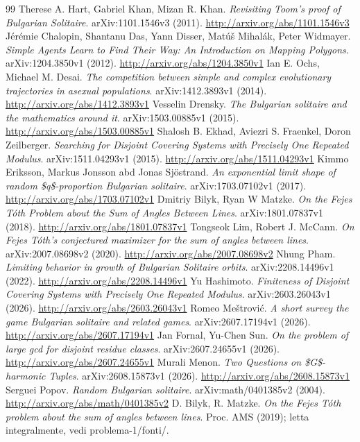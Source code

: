 \documentclass[11pt,a4paper]{article}
\begin{document}
\begin{thebibliography}{99}
 Therese A. Hart, Gabriel Khan, Mizan R. Khan. \emph{Revisiting Toom's proof of Bulgarian Solitaire}. arXiv:1101.1546v3 (2011). \url{http://arxiv.org/abs/1101.1546v3}
 Jérémie Chalopin, Shantanu Das, Yann Disser, Matúš Mihalák, Peter Widmayer. \emph{Simple Agents Learn to Find Their Way: An Introduction on Mapping Polygons}. arXiv:1204.3850v1 (2012). \url{http://arxiv.org/abs/1204.3850v1}
 Ian E. Ochs, Michael M. Desai. \emph{The competition between simple and complex evolutionary trajectories in asexual populations}. arXiv:1412.3893v1 (2014). \url{http://arxiv.org/abs/1412.3893v1}
 Vesselin Drensky. \emph{The Bulgarian solitaire and the mathematics around it}. arXiv:1503.00885v1 (2015). \url{http://arxiv.org/abs/1503.00885v1}
 Shalosh B. Ekhad, Aviezri S. Fraenkel, Doron Zeilberger. \emph{Searching for Disjoint Covering Systems with Precisely One Repeated Modulus}. arXiv:1511.04293v1 (2015). \url{http://arxiv.org/abs/1511.04293v1}
 Kimmo Eriksson, Markus Jonsson abd Jonas Sjöstrand. \emph{An exponential limit shape of random \$q\$-proportion Bulgarian solitaire}. arXiv:1703.07102v1 (2017). \url{http://arxiv.org/abs/1703.07102v1}
 Dmitriy Bilyk, Ryan W Matzke. \emph{On the Fejes Tóth Problem about the Sum of Angles Between Lines}. arXiv:1801.07837v1 (2018). \url{http://arxiv.org/abs/1801.07837v1}
 Tongseok Lim, Robert J. McCann. \emph{On Fejes Tóth's conjectured maximizer for the sum of angles between lines}. arXiv:2007.08698v2 (2020). \url{http://arxiv.org/abs/2007.08698v2}
 Nhung Pham. \emph{Limiting behavior in growth of Bulgarian Solitaire orbits}. arXiv:2208.14496v1 (2022). \url{http://arxiv.org/abs/2208.14496v1}
 Yu Hashimoto. \emph{Finiteness of Disjoint Covering Systems with Precisely One Repeated Modulus}. arXiv:2603.26043v1 (2026). \url{http://arxiv.org/abs/2603.26043v1}
 Romeo Meštrović. \emph{A short survey the game Bulgarian solitaire and related games}. arXiv:2607.17194v1 (2026). \url{http://arxiv.org/abs/2607.17194v1}
 Jan Fornal, Yu-Chen Sun. \emph{On the problem of large gcd for disjoint residue classes}. arXiv:2607.24655v1 (2026). \url{http://arxiv.org/abs/2607.24655v1}
 Murali Menon. \emph{Two Questions on \$G\$-harmonic Tuples}. arXiv:2608.15873v1 (2026). \url{http://arxiv.org/abs/2608.15873v1}
 Serguei Popov. \emph{Random Bulgarian solitaire}. arXiv:math/0401385v2 (2004). \url{http://arxiv.org/abs/math/0401385v2}
 D. Bilyk, R. Matzke. \emph{On the Fejes Tóth problem about the sum of angles between lines}. Proc. AMS (2019); letta integralmente, vedi problema-1/fonti/.
\end{thebibliography}
\end{document}
